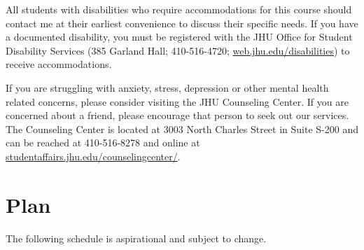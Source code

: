 \documentclass{amsart}
\theoremstyle{definition}
\theoremstyle{remark}
\numberwithin{equation}{section}
\begin{document}
All students with disabilities who require accommodations for this course should contact me at their earliest convenience to discuss their specific needs. If you have a documented disability, you must be registered with the JHU Office for Student Disability Services (385 Garland Hall; 410-516-4720; \href{http://web.jhu.edu/disabilities/}{web.jhu.edu/disabilities}) to receive accommodations.

 If you are struggling with anxiety, stress, depression or other mental health related concerns, please consider visiting the JHU Counseling Center. If you are concerned about a friend, please encourage that person to seek out our services. The Counseling Center is located at 3003 North Charles Street in Suite S-200 and can be reached at 410-516-8278 and online at  \href{http://studentaffairs.jhu.edu/counselingcenter/}{studentaffairs.jhu.edu/counselingcenter/}.

\section*{Plan}

The following schedule is aspirational and subject to change.\\
\end{document}
